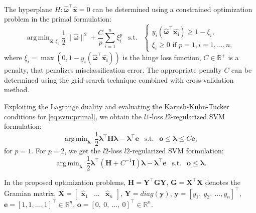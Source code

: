 \documentclass{aip-cp}
\DeclareMathOperator*{\argmin}{arg\,min}
\begin{document}
The hyperplane $H: \boldsymbol{\widehat{\omega}}^\top\boldsymbol{\widehat{x}}=0$ can be determined using a constrained optimization problem in the primal formulation:
\begin{equation}
    \argmin_{\boldsymbol{\widehat{\omega}},\xi_i} \frac{1}{2}\|\boldsymbol{\widehat{\omega}}\|^2 + \frac{C}{p}\sum_{i = 1}^n\xi_i^p ~~\text{ s.t. } ~~
    \begin{cases}
        y_i(\boldsymbol{\widehat{\omega}}^\top\boldsymbol{\widehat{x_i}})\geq1 - \xi_i,\\
        \xi_i \geq 0 \text{ if } p=1, i=1, ...,n,
    \end{cases}
    \label{eq:svm:primal}
\end{equation}
where $\xi_i = \max(0, 1-y_i(\boldsymbol{\widehat{\omega}}^\top\boldsymbol{\widehat{x_i}}))$ is the hinge loss function, $C \in \mathbb{R}^+$ is a penalty, that penalizes misclassification error. The appropriate penalty $C$ can be determined using the grid-search technique combined with cross-validation method.

Exploiting the Lagrange duality and evaluating the Karush-Kuhn-Tucker conditions for \eqref{eq:svm:primal},
we obtain the $l1$-loss $l2$-regularized SVM formulation:
\begin{equation}
    \argmin_{\boldsymbol{\lambda}} \ \frac{1}{2} \boldsymbol{\lambda}^\top \boldsymbol{H}  \boldsymbol{\lambda} -  \boldsymbol{\lambda}^\top \boldsymbol{e} ~~\text{ s.t. }~~ \boldsymbol{o} \leq  \boldsymbol{\lambda} \leq C\boldsymbol{e},
    \label{eq:svm:dualL1}
\end{equation}
for $p=1$. For $p=2$, we get the $l2$-loss $l2$-regularized SVM formulation:
\begin{equation}
    \argmin_{\boldsymbol{\lambda}} \ \frac{1}{2} \boldsymbol{\lambda}^\top \left(\boldsymbol{H} + C^{-1} \boldsymbol{I} \right) \boldsymbol{\lambda} -  \boldsymbol{\lambda}^\top \boldsymbol{e} ~~\text{ s.t. }~~    \boldsymbol{o} \leq  \boldsymbol{\lambda}.
    \label{eq:svm:dualL2}
\end{equation}

In the proposed optimization problems, $\boldsymbol{H} = \boldsymbol{Y}^\top \boldsymbol{G} \boldsymbol{Y}$, $\boldsymbol{G} = \boldsymbol{X}^\top\boldsymbol{X}$ denotes the Gramian matrix, $\boldsymbol{X}= \begin{bmatrix} \boldsymbol{\widehat{x}}_1 & \dots & \boldsymbol{\widehat{x}}_n \end{bmatrix}$, $\boldsymbol{Y} = diag(\boldsymbol{y})$, $\boldsymbol{y} = \left[y_1, \ y_2, \  \dots, y_n\right]^\top$, $\boldsymbol{e} = \left[1, 1, \dots, 1\right]^\top \in \mathbb{R}^n$, $\boldsymbol{o} = \left[0, \ 0,  \ \dots, \ 0\right]^\top \in \mathbb{R}^n$.
\end{document}
